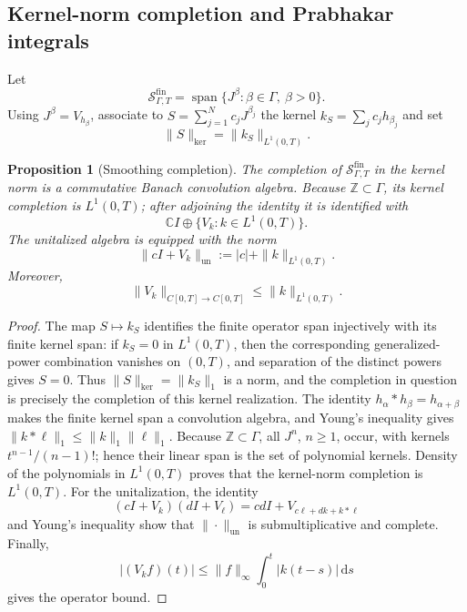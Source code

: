 \documentclass[11pt]{article}
\numberwithin{equation}{section}
\newtheorem{proposition}{Proposition}
\theoremstyle{definition}
\theoremstyle{remark}
\newcommand{\C}{\mathbb C}
\newcommand{\Z}{\mathbb Z}
\newcommand{\dd}{\,\mathrm d}
\newcommand{\Span}{\operatorname{span}}
\begin{document}
\subsection{Kernel-norm completion and Prabhakar integrals}

Let
\begin{equation*}
\mathcal S_{\Gamma,T}^{\mathrm{fin}}
=\Span\{J^\beta:\beta\in\Gamma,\ \beta>0\}.
\end{equation*}
Using $J^\beta=V_{h_\beta}$, associate to $S=\sum_{j=1}^Nc_jJ^{\beta_j}$ the kernel $k_S=\sum_jc_jh_{\beta_j}$ and set
\begin{equation*}
\|S\|_{\mathrm{ker}}=\|k_S\|_{L^1(0,T)}.
\end{equation*}

\begin{proposition}[Smoothing completion]\label{prop:smoothing}
The completion of $\mathcal S_{\Gamma,T}^{\mathrm{fin}}$ in the kernel norm is a commutative Banach convolution algebra. Because $\Z\subset\Gamma$, its kernel completion is $L^1(0,T)$; after adjoining the identity it is identified with
\begin{equation*}
\C I\oplus\{V_k:k\in L^1(0,T)\}.
\end{equation*}
The unitalized algebra is equipped with the norm
\begin{equation*}
\|cI+V_k\|_{\mathrm{un}}:=|c|+\|k\|_{L^1(0,T)}.
\end{equation*}
Moreover,
\begin{equation*}
\|V_k\|_{C[0,T]\to C[0,T]}\le\|k\|_{L^1(0,T)}.
\end{equation*}
\end{proposition}

\begin{proof}
The map $S\mapsto k_S$ identifies the finite operator span injectively with its finite kernel span: if $k_S=0$ in $L^1(0,T)$, then the corresponding generalized-power combination vanishes on $(0,T)$, and separation of the distinct powers gives $S=0$. Thus $\|S\|_{\mathrm{ker}}=\|k_S\|_1$ is a norm, and the completion in question is precisely the completion of this kernel realization. The identity $h_\alpha*h_\beta=h_{\alpha+\beta}$ makes the finite kernel span a convolution algebra, and Young's inequality gives $\|k*\ell\|_1\le\|k\|_1\|\ell\|_1$. Because $\Z\subset\Gamma$, all $J^n$, $n\ge1$, occur, with kernels $t^{n-1}/(n-1)!$; hence their linear span is the set of polynomial kernels. Density of the polynomials in $L^1(0,T)$ proves that the kernel-norm completion is $L^1(0,T)$.
For the unitalization, the identity
\begin{equation*}
(cI+V_k)(dI+V_\ell)=cdI+V_{c\ell+dk+k*\ell}
\end{equation*}
and Young's inequality show that $\|\cdot\|_{\mathrm{un}}$ is submultiplicative and complete. Finally,
\begin{equation*}
|(V_kf)(t)|\le\|f\|_\infty\int_0^t|k(t-s)|\dd s
\end{equation*}
gives the operator bound.
\end{proof}
\end{document}
